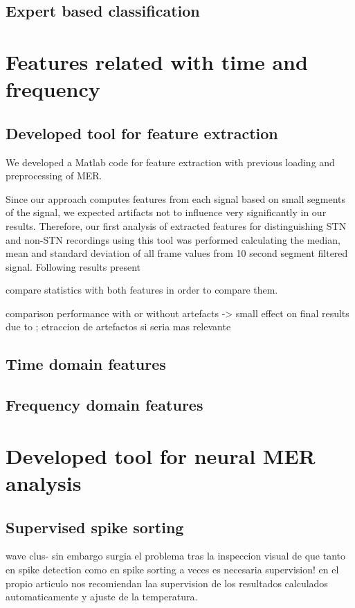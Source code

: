 \subsection{Expert based classification}

\section{Features related with time and frequency}


\subsection{Developed tool for feature extraction}

We developed a Matlab code for feature extraction with previous loading and preprocessing of MER. 

Since our approach computes features from each signal based on small segments of the signal, we expected artifacts not to influence very significantly in our results. Therefore, our first analysis of extracted features for distinguishing STN and non-STN recordings using this tool was performed calculating the median, mean and standard deviation of all frame values from  10 second segment filtered signal. Following results present 


compare statistics with both features in order to compare them. 




comparison performance with or without artefacts
-> small effect on final results due to ; etraccion de artefactos si seria mas relevante 


\subsection{Time domain features}

\subsection{Frequency domain features}

\section{Developed tool for neural MER analysis}

\subsection{Supervised spike sorting}
wave clus- sin embargo surgia el problema tras la inspeccion visual de que tanto en spike detection como en spike sorting a veces es necesaria supervision! en el propio articulo nos recomiendan laa supervision de los resultados calculados automaticamente y ajuste de la temperatura.

